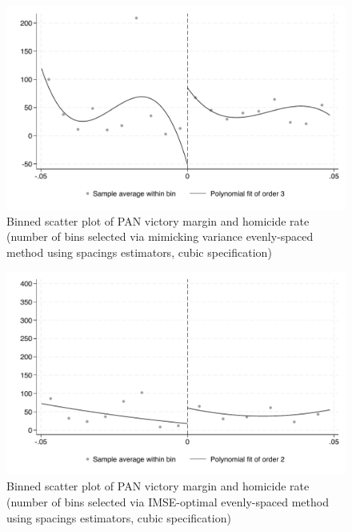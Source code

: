 \documentclass{article}
\begin{document}
\begin{figure}[H]
    \centering
    \includegraphics[scale=0.5]{../outputs/binned_scatter_esmv_cubic_plot.pdf}
    \caption{Binned scatter plot of PAN victory margin and homicide rate (number of bins selected via mimicking variance evenly-spaced method using spacings estimators, cubic specification)}
    \label{fig:binned_scatter_esmv_cubic}
\end{figure}

\begin{figure}[H]
    \centering
    \includegraphics[scale=0.5]{../outputs/binned_scatter_es_cubic_plot.pdf}
    \caption{Binned scatter plot of PAN victory margin and homicide rate (number of bins selected via IMSE-optimal evenly-spaced method using spacings estimators, cubic specification)}
    \label{fig:binned_scatter_es_cubic}
\end{figure}
\end{document}
